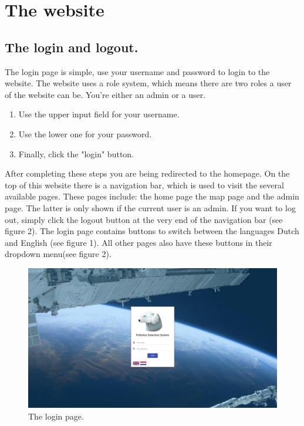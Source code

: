 \documentclass[a4paper]{article}
\begin{document}
\newpage
\section{The website}
\subsection{The login and logout.}
The login page is simple, use your username and password to login to the website. The website uses a role system, which means there are two roles a user of the website can be. You're either an admin or a user. 

\begin{enumerate}[]
	\item Use the upper input field for your username.
	\item Use the lower one for your password.
	\item Finally, click the "login" button.
\end{enumerate}
\noindent
After completing these steps you are being redirected to the homepage.
\newline
\newline
On the top of this website there is a navigation bar, which is used to visit the several available pages. These pages include: the home page the map page and the admin page. The latter is only shown if the current user is an admin.
\newline
\newline
If you want to log out, simply click the logout button at the very end of the navigation bar (see figure 2).
\newline
\newline
The login page contains buttons to switch between the languages Dutch and English (see figure 1).
\newline
All other pages also have these buttons in their dropdown menu(see figure 2).
\newline


\begin{figure}[h!]
  \caption{The login page.}
  \centering
  \includegraphics[width=1\textwidth]{login}
\end{figure}
\end{document}

